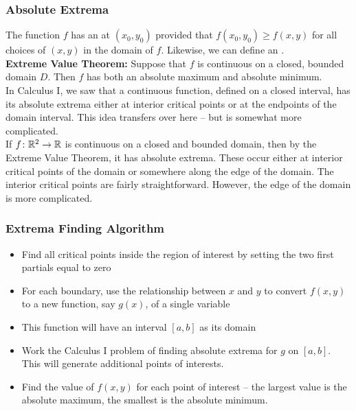 \subsubsection{Absolute Extrema}

The function \(f\) has an  at \((x_{0}, y_{0})\) provided that \(f(x_{0}, y_{0}) \geq f(x, y)\) for all choices of \((x, y)\) in the domain of \(f\). Likewise, we can define an . \\

\textbf{Extreme Value Theorem:} Suppose that \(f\) is continuous on a closed, bounded domain \(D\). Then \(f\) has both an absolute maximum and absolute minimum. \\

In Calculus I, we saw that a continuous function, defined on a closed interval, has its absolute extrema either at interior critical points or at the endpoints of the domain interval. This idea transfers over here – but is somewhat more complicated. \\

If \(f \colon \mathbb{R}^{2} \to \mathbb{R}\) is continuous on a closed and bounded domain, then by the Extreme Value Theorem, it has absolute extrema. These occur either at interior critical points of the domain or somewhere along the edge of the domain. The interior critical points are fairly straightforward. However, the edge of the domain is more complicated.

\subsubsection{Extrema Finding Algorithm}

\begin{itemize}
    \item Find all critical points inside the region of interest by setting the two first partials equal to zero
    \item For each boundary, use the relationship between \(x\) and \(y\) to convert \(f(x, y)\) to a new function, say \(g(x)\), of a single variable
    \item This function will have an interval \([a, b]\) as its domain
    \item Work the Calculus I problem of finding absolute extrema for \(g\) on \([a, b]\). This will generate additional points of interests.
    \item Find the value of \(f(x, y)\) for each point of interest – the largest value is the absolute maximum, the smallest is the absolute minimum.
\end{itemize}

